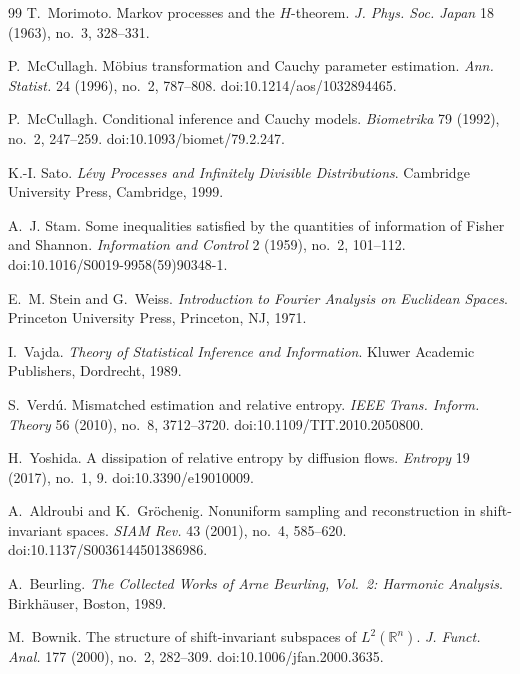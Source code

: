 \begin{thebibliography}{99}
T.~Morimoto.
\newblock Markov processes and the \(H\)-theorem.
\newblock \emph{J. Phys. Soc. Japan} 18 (1963), no.~3, 328--331.

P.~McCullagh.
\newblock M{\"o}bius transformation and Cauchy parameter estimation.
\newblock \emph{Ann. Statist.} 24 (1996), no.~2, 787--808.
\newblock doi:10.1214/aos/1032894465.

P.~McCullagh.
\newblock Conditional inference and Cauchy models.
\newblock \emph{Biometrika} 79 (1992), no.~2, 247--259.
\newblock doi:10.1093/biomet/79.2.247.

K.-I. Sato.
\newblock \emph{L{\'e}vy Processes and Infinitely Divisible Distributions}.
\newblock Cambridge University Press, Cambridge, 1999.

A.~J. Stam.
\newblock Some inequalities satisfied by the quantities of information of
Fisher and Shannon.
\newblock \emph{Information and Control} 2 (1959), no.~2, 101--112.
\newblock doi:10.1016/S0019-9958(59)90348-1.

E.~M. Stein and G.~Weiss.
\newblock \emph{Introduction to Fourier Analysis on Euclidean Spaces}.
\newblock Princeton University Press, Princeton, NJ, 1971.

I.~Vajda.
\newblock \emph{Theory of Statistical Inference and Information}.
\newblock Kluwer Academic Publishers, Dordrecht, 1989.

S.~Verd{\'u}.
\newblock Mismatched estimation and relative entropy.
\newblock \emph{IEEE Trans. Inform. Theory} 56 (2010), no.~8, 3712--3720.
\newblock doi:10.1109/TIT.2010.2050800.

H.~Yoshida.
\newblock A dissipation of relative entropy by diffusion flows.
\newblock \emph{Entropy} 19 (2017), no.~1, 9.
\newblock doi:10.3390/e19010009.

A.~Aldroubi and K.~Gr{\"o}chenig.
\newblock Nonuniform sampling and reconstruction in shift-invariant spaces.
\newblock \emph{SIAM Rev.} 43 (2001), no.~4, 585--620.
\newblock doi:10.1137/S0036144501386986.

A.~Beurling.
\newblock \emph{The Collected Works of Arne Beurling, Vol.~2: Harmonic Analysis}.
\newblock Birkh{\"a}user, Boston, 1989.

M.~Bownik.
\newblock The structure of shift-invariant subspaces of \(L^2(\mathbb R^n)\).
\newblock \emph{J. Funct. Anal.} 177 (2000), no.~2, 282--309.
\newblock doi:10.1006/jfan.2000.3635.


\end{thebibliography}
